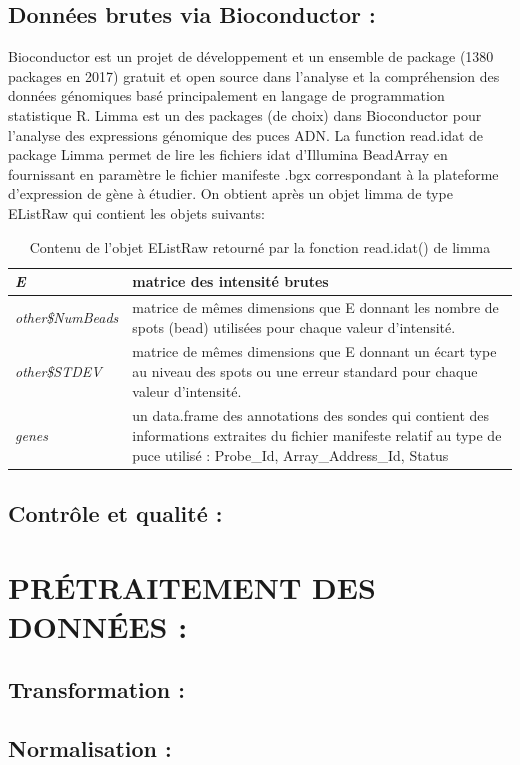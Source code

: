\documentclass[a4paper,10pt]{article}
\begin{document}
\subsection{ Données brutes via Bioconductor :}
Bioconductor est un projet de développement et un ensemble de package (1380 packages en 2017)  gratuit et open source dans l’analyse et la compréhension des données génomiques basé principalement en langage de programmation statistique R.
Limma est un des packages (de choix) dans Bioconductor pour l’analyse des expressions génomique des puces  ADN. La function read.idat de package Limma permet de lire les fichiers idat d’Illumina BeadArray en fournissant en paramètre le fichier manifeste .bgx correspondant à la plateforme d’expression de gène à étudier.
On obtient après un objet limma de type EListRaw  qui contient les objets suivants:
\begin{table}[!ht]
\begin{tabular}{|l|p{9cm}|}
\hline
 \emph{E} & matrice des intensité brutes\\
\hline
\emph{other\$NumBeads }   &  matrice de mêmes dimensions que E donnant les nombre de spots (bead) utilisées pour chaque valeur d'intensité. \\
\hline 
\emph{other\$STDEV} & matrice de mêmes dimensions que E donnant un écart type au niveau des spots ou une erreur standard pour chaque valeur d'intensité.\\
\hline
\emph{genes} & un data.frame des annotations des sondes qui contient des informations extraites du fichier manifeste relatif au type de puce utilisé : Probe\_Id, Array\_Address\_Id, Status
\\
\hline
\end{tabular}
\caption{Contenu de l'objet EListRaw retourné par la fonction read.idat() de limma}
\label{EListRaw}
\end{table}
\subsection{ Contrôle et qualité :}

\section{PR\'{E}TRAITEMENT DES DONN\'{E}ES :}
\subsection{Transformation :}
\subsection{Normalisation :}
\end{document}
